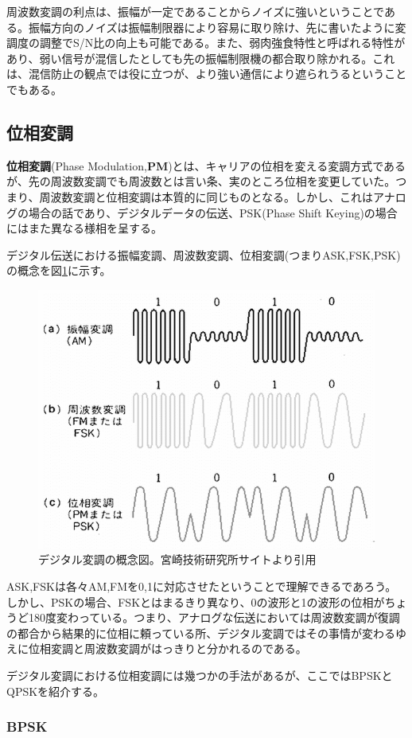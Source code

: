 周波数変調の利点は、振幅が一定であることからノイズに強いということである。振幅方向のノイズは振幅制限器により容易に取り除け、先に書いたように変調度の調整でS/N比の向上も可能である。また、弱肉強食特性と呼ばれる特性があり、弱い信号が混信したとしても先の振幅制限機の都合取り除かれる。これは、混信防止の観点では役に立つが、より強い通信により遮られうるということでもある。

\subsection{位相変調}
\textbf{位相変調}(Phase Modulation,\textbf{PM})とは、キャリアの位相を変える変調方式であるが、先の周波数変調でも周波数とは言い条、実のところ位相を変更していた。つまり、周波数変調と位相変調は本質的に同じものとなる。しかし、これはアナログの場合の話であり、デジタルデータの伝送、PSK(Phase Shift Keying)の場合にはまた異なる様相を呈する。

デジタル伝送における振幅変調、周波数変調、位相変調(つまりASK,FSK,PSK)の概念を図\ref{fig6_4}に示す。
\begin{figure}[htb]
\centering
\includegraphics[width=0.6\linewidth,keepaspectratio,bb=0 0 616 472]{fig/fig6_4.png}
\caption{デジタル変調の概念図。宮崎技術研究所サイトより引用}\label{fig6_4}
\end{figure}

ASK,FSKは各々AM,FMを0,1に対応させたということで理解できるであろう。しかし、PSKの場合、FSKとはまるきり異なり、0の波形と1の波形の位相がちょうど180度変わっている。つまり、アナログな伝送においては周波数変調が復調の都合から結果的に位相に頼っている所、デジタル変調ではその事情が変わるゆえに位相変調と周波数変調がはっきりと分かれるのである。

デジタル変調における位相変調には幾つかの手法があるが、ここではBPSKとQPSKを紹介する。

\subsubsection{BPSK}

